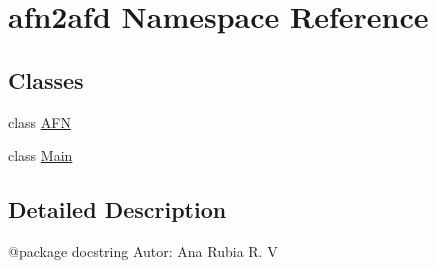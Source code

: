 \hypertarget{namespaceafn2afd}{}\section{afn2afd Namespace Reference}
\label{namespaceafn2afd}
\subsection*{Classes}
\begin{DoxyCompactItemize}
\item 
class \hyperlink{classafn2afd_1_1AFN}{A\+FN}
\item 
class \hyperlink{classafn2afd_1_1Main}{Main}
\end{DoxyCompactItemize}


\subsection{Detailed Description}
\begin{DoxyVerb}@package docstring
    Autor: Ana Rubia R. V \end{DoxyVerb}
 